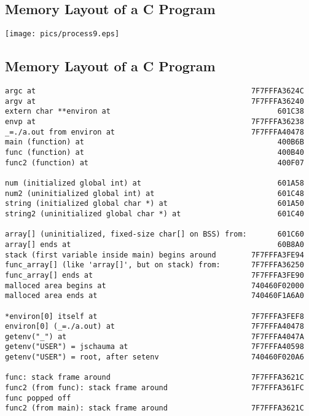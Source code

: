 \documentclass[xga]{xdvislides}
\begin{document}
\subsection{Memory Layout of a C Program}
\begin{center}
	\texttt{[image: pics/process9.eps]}
\end{center}

\subsection{Memory Layout of a C Program}
\small
\begin{verbatim}
argc at                                                 7F7FFFA3624C
argv at                                                 7F7FFFA36240
extern char **environ at                                      601C38
envp at                                                 7F7FFFA36238
_=./a.out from environ at                               7F7FFFA40478
main (function) at                                            400B6B
func (function) at                                            400B40
func2 (function) at                                           400F07

num (initialized global int) at                               601A58
num2 (uninitialized global int) at                            601C48
string (initialized global char *) at                         601A50
string2 (uninitialized global char *) at                      601C40

array[] (uninitialized, fixed-size char[] on BSS) from:       601C60
array[] ends at                                               60B8A0
stack (first variable inside main) begins around        7F7FFFA3FE94
func_array[] (like 'array[]', but on stack) from:       7F7FFFA36250
func_array[] ends at                                    7F7FFFA3FE90
malloced area begins at                                 740460F02000
malloced area ends at                                   740460F1A6A0

*environ[0] itself at                                   7F7FFFA3FEF8
environ[0] (_=./a.out) at                               7F7FFFA40478
getenv("_") at                                          7F7FFFA4047A
getenv("USER") = jschauma at                            7F7FFFA40598
getenv("USER") = root, after setenv                     740460F020A6

func: stack frame around                                7F7FFFA3621C
func2 (from func): stack frame around                   7F7FFFA361FC
func popped off
func2 (from main): stack frame around                   7F7FFFA3621C
\end{verbatim}
\Normalsize
\end{document}
